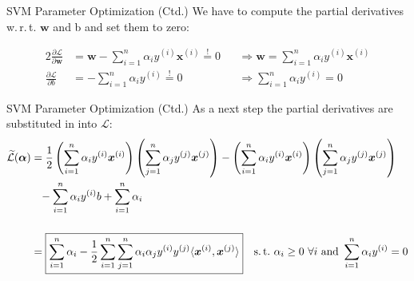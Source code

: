 \begin{frame}{SVM Parameter Optimization (Ctd.)}{}\important
	We have to compute the partial derivatives w.\,r.\,t. $\bm{w}$ and b and set them to zero:
		
	\begin{alignat}{2}
		\frac{\partial \mathcal{L}}{\partial \bm{w}}
			&= \bm{w} - \sum_{i=1}^n \alpha_i y^{(i)} \bm{x}^{(i)} \overset{!}{=} 0
				&&\Rightarrow \boxed{\bm{w} = \sum_{i=1}^n \alpha_i y^{(i)} \bm{x}^{(i)}} \\[5mm]
		\frac{\partial \mathcal{L}}{\partial b} 
			&= -\sum_{i=1}^n \alpha_i y^{(i)} \overset{!}{=} 0
				&&\Rightarrow \boxed{\sum_{i=1}^n \alpha_i y^{(i)} = 0}
	\end{alignat}
\end{frame}


\begin{frame}{SVM Parameter Optimization (Ctd.)}{}\optional
	As a next step the partial derivatives are substituted in into $\mathcal{L}$:
	\footnotesize
	\begin{align}
		\nonumber
		\widetilde{\mathcal{L}}(\bm{\alpha})
		&=
			\frac{1}{2} \left( \sum_{i=1}^n \alpha_i y^{(i)} \bm{x}^{(i)} \right)\left( \sum_{j=1}^n \alpha_j y^{(j)} \bm{x}^{(j)} \right) -
			\left( \sum_{i=1}^n \alpha_i y^{(i)} \bm{x}^{(i)} \right) \left( \sum_{j=1}^n \alpha_j y^{(j)} \bm{x}^{(j)} \right) \\
		&\phantom{=} - \sum_{i=1}^n \alpha_i y^{(i)} b + \sum_{i=1}^n \alpha_i \\[5mm]
		&=
			\boxed{
				\sum_{i=1}^n \alpha_i - \frac{1}{2} \sum_{i=1}^n \sum_{j=1}^n
					\alpha_i \alpha_j y^{(i)} y^{(j)} \langle \bm{x}^{(i)}, \bm{x}^{(j)} \rangle
			} \quad \text{s.\,t.}\ \alpha_i \ge 0\ \forall i\ \text{and}\ \sum_{i=1}^n \alpha_i y^{(i)} = 0
	\end{align}
	\normalsize
\end{frame}


